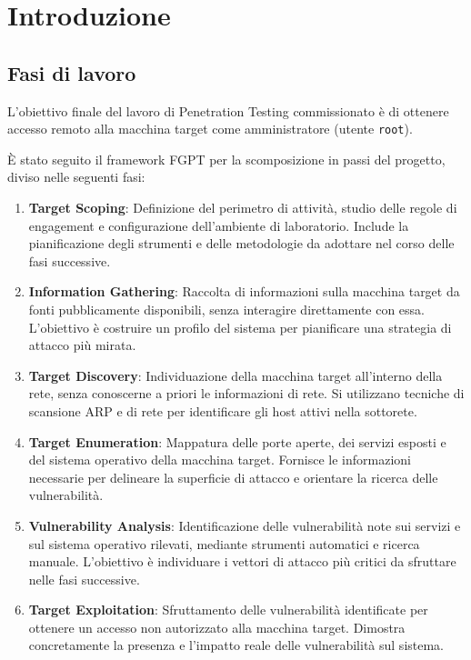 \documentclass[12pt, a4paper]{article}
\begin{document}
	
	\newpage
	\thispagestyle{empty}
	\tableofcontents
	
	\newpage
	\section{Introduzione}
	\subsection{Fasi di lavoro}
	L'obiettivo finale del lavoro di Penetration Testing commissionato è di ottenere accesso remoto alla macchina target come amministratore (utente \texttt{root}).
	
	È stato seguito il framework FGPT per la scomposizione in passi del progetto, diviso nelle seguenti fasi:
	\begin{enumerate}
		\item \textbf{Target Scoping}: Definizione del perimetro di attività, studio
		delle regole di engagement e configurazione dell'ambiente di laboratorio.
		Include la pianificazione degli strumenti e delle metodologie da adottare
		nel corso delle fasi successive.
		
		\item \textbf{Information Gathering}: Raccolta di informazioni sulla macchina
		target da fonti pubblicamente disponibili, senza interagire direttamente con
		essa. L'obiettivo è costruire un profilo del sistema per pianificare una
		strategia di attacco più mirata.
		
		\item \textbf{Target Discovery}: Individuazione della macchina target
		all'interno della rete, senza conoscerne a priori le informazioni di rete.
		Si utilizzano tecniche di scansione ARP e di rete per identificare gli host
		attivi nella sottorete.
		
		\item \textbf{Target Enumeration}: Mappatura delle porte aperte, dei servizi
		esposti e del sistema operativo della macchina target. Fornisce le
		informazioni necessarie per delineare la superficie di attacco e orientare
		la ricerca delle vulnerabilità.
		
		\item \textbf{Vulnerability Analysis}: Identificazione delle vulnerabilità
		note sui servizi e sul sistema operativo rilevati, mediante strumenti
		automatici e ricerca manuale. L'obiettivo è individuare i vettori di attacco
		più critici da sfruttare nelle fasi successive.
		
		\item \textbf{Target Exploitation}: Sfruttamento delle vulnerabilità
		identificate per ottenere un accesso non autorizzato alla macchina target.
		Dimostra concretamente la presenza e l'impatto reale delle vulnerabilità
		sul sistema.
		

\end{enumerate}
\end{document}
